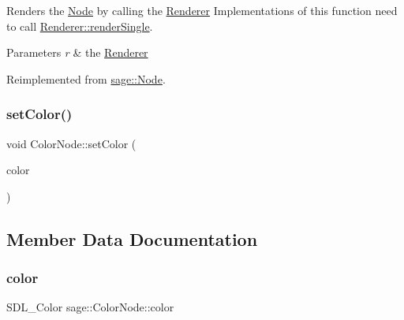 Renders the \mbox{\hyperlink{classsage_1_1Node}{Node}} by calling the \mbox{\hyperlink{classsage_1_1Renderer}{Renderer}} Implementations of this function need to call \mbox{\hyperlink{classsage_1_1Renderer_aa79cfd587fa85ae8ea7ccf465825d212}{Renderer\+::render\+Single}}. 


\begin{DoxyParams}{Parameters}
{\em r} & the \mbox{\hyperlink{classsage_1_1Renderer}{Renderer}} \\
\hline
\end{DoxyParams}


Reimplemented from \mbox{\hyperlink{classsage_1_1Node_a1a5d13b9c959039084843403382f73eb}{sage\+::\+Node}}.

\mbox{\label{classsage_1_1ColorNode_a65747783aeea07d997c54b3ef8d212f8}} 
\subsubsection{\texorpdfstring{setColor()}{setColor()}}
{\footnotesize\ttfamily void Color\+Node\+::set\+Color (\begin{DoxyParamCaption}\item[{S\+D\+L\+\_\+\+Color}]{color }\end{DoxyParamCaption})}



\subsection{Member Data Documentation}
\mbox{\label{classsage_1_1ColorNode_aad5832e161e608730df9512894725d2d}} 
\subsubsection{\texorpdfstring{color}{color}}
{\footnotesize\ttfamily S\+D\+L\+\_\+\+Color sage\+::\+Color\+Node\+::color\hspace{0.3cm}{\ttfamily [private]}}

\mbox{\label{classsage_1_1ColorNode_a04b687374b9c171ff820c514f15b0ae0}} 
